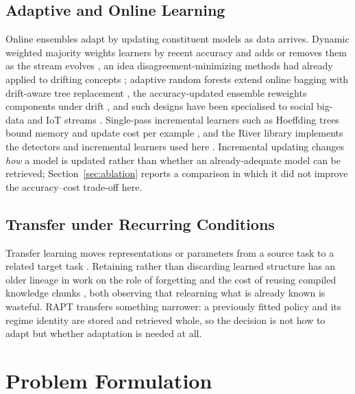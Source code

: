 \documentclass[conference]{IEEEtran}
\begin{document}
\subsection{Adaptive and Online Learning}
Online ensembles adapt by updating constituent models as data arrives. Dynamic
weighted majority weights learners by recent accuracy and adds or removes them as the
stream evolves \cite{JMLR:v8:kolter07a}, an idea disagreement-minimizing methods had
already applied to drifting concepts \cite{helmbold1994tracking}; adaptive random
forests extend online bagging with drift-aware tree replacement \cite{gomes2017adaptive},
the accuracy-updated ensemble reweights components under drift \cite{brzezinski2013reacting},
and such designs have been specialised to social big-data and IoT streams
\cite{abbasi2021elstream,yang2021pwpae}. Single-pass incremental learners such as
Hoeffding trees bound memory and update cost per example \cite{domingos2000mining},
and the River library implements the detectors and incremental learners used here
\cite{montiel2021river}. Incremental updating changes \emph{how} a model is updated
rather than whether an already-adequate model can be retrieved; Section~\ref{sec:ablation}
reports a comparison in which it did not improve the accuracy--cost trade-off here.

\subsection{Transfer under Recurring Conditions}
Transfer learning moves representations or parameters from a source task to a
related target task \cite{pan2010transfer}. Retaining rather than discarding learned
structure has an older lineage in work on the role of forgetting \cite{markovitch1988role}
and the cost of reusing compiled knowledge chunks \cite{tambe1988some}, both
observing that relearning what is already known is wasteful. RAPT transfers something
narrower: a previously fitted policy and its regime identity are stored and retrieved
whole, so the decision is not how to adapt but whether adaptation is needed at all.

\section{Problem Formulation}
\end{document}
